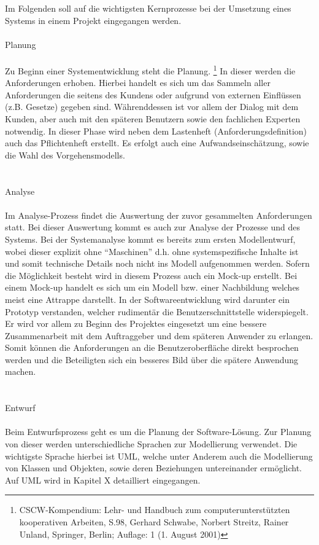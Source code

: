 Im Folgenden soll auf die wichtigsten Kernprozesse bei der Umsetzung eines Systems in einem Projekt eingegangen werden.\\
\\
Planung\\
\\
Zu Beginn einer Systementwicklung steht die Planung. \footnote{CSCW-Kompendium: Lehr- und Handbuch zum computerunterstützten kooperativen Arbeiten, S.98,  Gerhard Schwabe, Norbert Streitz, Rainer Unland, Springer, Berlin; Auflage: 1 (1. August 2001)}
In dieser werden die Anforderungen erhoben.
Hierbei handelt es sich um das Sammeln aller Anforderungen die seitens des Kundens oder aufgrund von externen Einflüssen (z.B. Gesetze) gegeben sind.
Währenddessen ist vor allem der Dialog mit dem Kunden, aber auch mit den späteren Benutzern sowie den fachlichen Experten notwendig.
In dieser Phase wird neben dem Lastenheft (Anforderungsdefinition) auch das Pflichtenheft erstellt. Es erfolgt auch eine Aufwandseinschätzung, sowie die Wahl des Vorgehensmodells.\\
\\
\\
Analyse\\
\\
Im Analyse-Prozess findet die Auswertung der zuvor gesammelten Anforderungen statt. Bei dieser Auswertung kommt es auch zur Analyse der Prozesse und des Systems. Bei der Systemanalyse kommt es bereits zum ersten Modellentwurf, wobei dieser explizit ohne “Maschinen” d.h. ohne systemspezifische Inhalte ist und somit technische Details noch nicht ins Modell aufgenommen werden. Sofern die Möglichkeit besteht wird in diesem Prozess auch ein Mock-up erstellt. Bei einem Mock-up handelt es sich um ein Modell bzw. einer Nachbildung welches meist eine Attrappe darstellt. In der Softwareentwicklung wird darunter ein Prototyp verstanden, welcher rudimentär die Benutzerschnittstelle widerspiegelt. Er wird vor allem zu Beginn des Projektes eingesetzt um eine bessere Zusammenarbeit mit dem Auftraggeber und dem späteren Anwender zu erlangen. Somit können die Anforderungen an die Benutzeroberfläche direkt besprochen werden und die Beteiligten sich ein besseres Bild über die spätere Anwendung machen.\\
\\
\\
Entwurf\\
\\
Beim Entwurfsprozess geht es um die Planung der Software-Lösung. Zur Planung von dieser werden unterschiedliche Sprachen zur Modellierung verwendet. Die wichtigste Sprache hierbei ist UML, welche unter Anderem auch die Modellierung von Klassen und Objekten, sowie deren Beziehungen untereinander ermöglicht. Auf UML wird in Kapitel X detailliert eingegangen.
